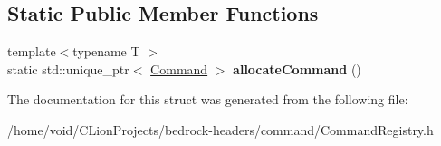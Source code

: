 \subsection*{Static Public Member Functions}
\begin{DoxyCompactItemize}
\item 
\mbox{\label{struct_command_registry_acd8c4d268c83897b3dfd130228233fcd}} 
{\footnotesize template$<$typename T $>$ }\\static std\+::unique\+\_\+ptr$<$ \mbox{\hyperlink{struct_command}{Command}} $>$ {\bfseries allocate\+Command} ()
\end{DoxyCompactItemize}


The documentation for this struct was generated from the following file\+:\begin{DoxyCompactItemize}
\item 
/home/void/\+C\+Lion\+Projects/bedrock-\/headers/command/Command\+Registry.\+h\end{DoxyCompactItemize}

